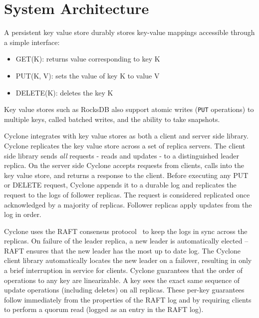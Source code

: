 \documentclass[twocolumn]{article}
\begin{document}
\section{System Architecture}
\label{sec:sysarch}
A persistent key value store durably stores key-value mappings accessible
through a simple interface:

\begin{itemize}
\item GET(K): returns value corresponding to key K
\item PUT(K, V): sets the value of key K to value V
\item DELETE(K): deletes the key K
\end{itemize}

Key value stores such as RocksDB also support atomic writes ({\tt PUT}
operations) to multiple keys, called batched writes, and the ability to take
snapshots.

Cyclone integrates with key value stores as both a client and server side
library. Cyclone replicates the key value store across a set of replica
servers. The client side library sends \emph{all} requests - reads and updates -
to a distinguished leader replica.  On the server side Cyclone accepts requests
from clients, calls into the key value store, and returns a response to the
client. Before executing any PUT or DELETE request, Cyclone appends it to a
durable log and replicates the request to the logs of follower replicas. The
request is considered replicated once acknowledged by a majority of
replicas. Follower replicas apply updates from the log in order.

Cyclone uses the RAFT consensus protocol~\cite{raft} to keep the logs in sync
across the replicas. On failure of the leader replica, a new leader is
automatically elected -- RAFT ensures that the new leader has the most up to
date log. The Cyclone client library automatically locates the new leader on a
failover, resulting in only a brief interruption in service for
clients.  Cyclone guarantees that the order of operations to any key are linearizable. 
A key sees the exact same sequence of update operations (including deletes) 
on all replicas. These per-key guarantees follow immediately from the 
properties of the RAFT log and by requiring clients to perform a quorum read (logged
as an entry in the RAFT log).
\end{document}
